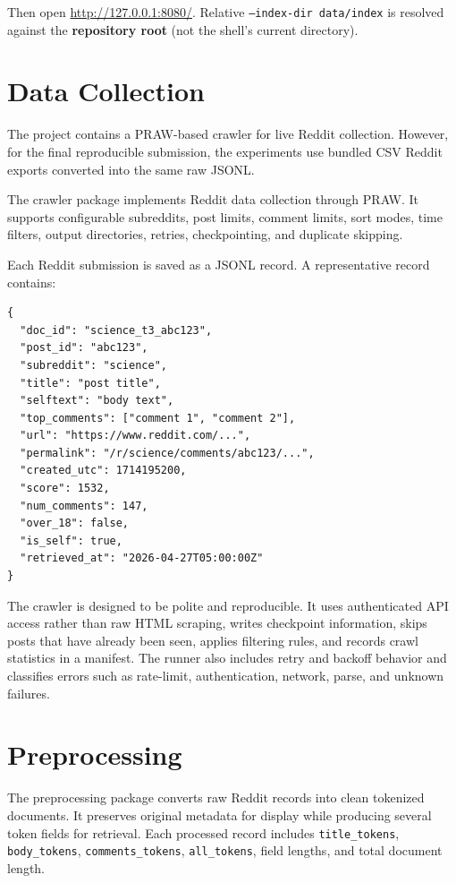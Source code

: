 \documentclass[11pt]{article}
\begin{document}
\noindent Then open \url{http://127.0.0.1:8080/}. Relative \texttt{--index-dir
data/index} is resolved against the \textbf{repository root} (not the shell's
current directory). 

\section{Data Collection}
The project contains a PRAW-based crawler for live Reddit collection. However, for the final reproducible submission, the experiments use bundled CSV Reddit exports converted into the same raw JSONL. 

\noindent The crawler package implements Reddit data collection through PRAW. It supports configurable subreddits, post limits, comment limits, sort modes, time filters, output directories, retries, checkpointing, and duplicate skipping.

\noindent Each Reddit submission is saved as a JSONL record. A representative record contains:

\begin{lstlisting}
{
  "doc_id": "science_t3_abc123",
  "post_id": "abc123",
  "subreddit": "science",
  "title": "post title",
  "selftext": "body text",
  "top_comments": ["comment 1", "comment 2"],
  "url": "https://www.reddit.com/...",
  "permalink": "/r/science/comments/abc123/...",
  "created_utc": 1714195200,
  "score": 1532,
  "num_comments": 147,
  "over_18": false,
  "is_self": true,
  "retrieved_at": "2026-04-27T05:00:00Z"
}
\end{lstlisting}

The crawler is designed to be polite and reproducible. It uses authenticated API access rather than raw HTML scraping, writes checkpoint information, skips posts that have already been seen, applies filtering rules, and records crawl statistics in a manifest. The runner also includes retry and backoff behavior and classifies errors such as rate-limit, authentication, network, parse, and unknown failures.

\section{Preprocessing}
The preprocessing package converts raw Reddit records into clean tokenized documents. It preserves original metadata for display while producing several token fields for retrieval. Each processed record includes \texttt{title\_tokens}, \texttt{body\_tokens}, \texttt{comments\_tokens}, \texttt{all\_tokens}, field lengths, and total document length.
\end{document}
